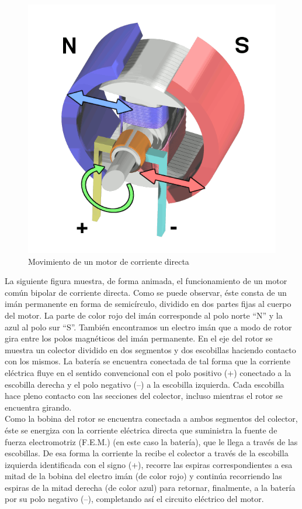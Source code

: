 \documentclass[12pt,a4paper]{article}
\begin{document}
\newpage
\begin{figure}[hbtp]
\centering
\includegraphics[scale=0.3]{Circuitos/Movimiento.png}
\caption{Movimiento de un motor de corriente directa}
\end{figure}
La siguiente figura muestra, de forma animada, el funcionamiento de un motor común bipolar de corriente directa. Como se puede observar, éste consta de un imán permanente en forma de semicírculo, dividido en dos partes fijas al cuerpo del motor. La parte de color rojo del imán corresponde al polo norte “N” y la azul al polo sur “S”. También encontramos un electro imán que a modo de rotor gira entre los polos magnéticos del imán permanente. En el eje del rotor se muestra un colector dividido en dos segmentos y dos escobillas haciendo contacto con los mismos. La batería se encuentra conectada de tal forma que la corriente eléctrica fluye en el sentido convencional con el polo positivo (+) conectado a la escobilla derecha y el polo negativo (–) a la escobilla izquierda. Cada escobilla hace pleno contacto con las secciones del colector, incluso mientras el rotor se encuentra girando.\\
Como la bobina del rotor se encuentra conectada a ambos segmentos del colector, éste se energiza con la corriente eléctrica directa que suministra la fuente de fuerza electromotriz (F.E.M.) (en este caso la batería), que le llega a través de las escobillas. De esa forma la corriente la recibe el colector a través de la escobilla izquierda identificada con el signo (+), recorre las espiras correspondientes a esa mitad de la bobina del electro imán (de color rojo) y continúa recorriendo las espiras de la mitad derecha (de color azul) para retornar, finalmente, a la batería por su polo negativo (–), completando así el circuito eléctrico del motor.\\
\end{document}
